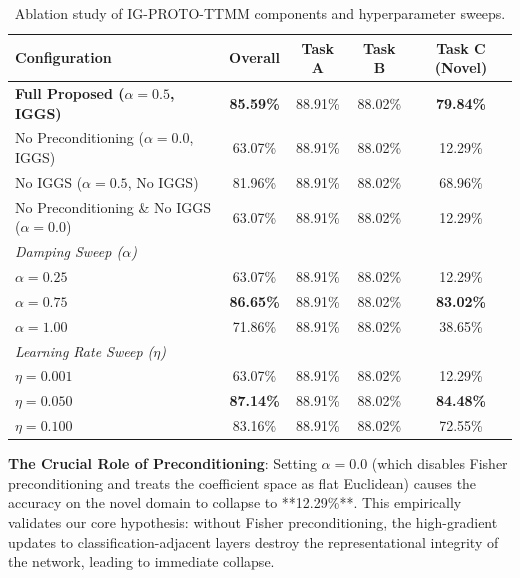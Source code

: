\documentclass{article}
\theoremstyle{plain}
\theoremstyle{definition}
\theoremstyle{remark}
\begin{document}
\begin{table}[t]
\caption{Ablation study of IG-PROTO-TTMM components and hyperparameter sweeps.}
\label{tab:ablations}
\vskip 0.15in
\begin{center}
\begin{small}
\begin{sc}
\begin{tabular}{lcccc}
\toprule
Configuration & Overall & Task A & Task B & Task C (Novel) \\
\midrule
\textbf{Full Proposed ($\alpha=0.5$, IGGS)} & \textbf{85.59\%} & 88.91\% & 88.02\% & \textbf{79.84\%} \\
No Preconditioning ($\alpha=0.0$, IGGS) & 63.07\% & 88.91\% & 88.02\% & 12.29\% \\
No IGGS ($\alpha=0.5$, No IGGS) & 81.96\% & 88.91\% & 88.02\% & 68.96\% \\
No Preconditioning \& No IGGS ($\alpha=0.0$) & 63.07\% & 88.91\% & 88.02\% & 12.29\% \\
\midrule
\textit{Damping Sweep ($\alpha$)} \\
$\alpha = 0.25$ & 63.07\% & 88.91\% & 88.02\% & 12.29\% \\
$\alpha = 0.75$ & \textbf{86.65\%} & 88.91\% & 88.02\% & \textbf{83.02\%} \\
$\alpha = 1.00$ & 71.86\% & 88.91\% & 88.02\% & 38.65\% \\
\midrule
\textit{Learning Rate Sweep ($\eta$)} \\
$\eta = 0.001$ & 63.07\% & 88.91\% & 88.02\% & 12.29\% \\
$\eta = 0.050$ & \textbf{87.14\%} & 88.91\% & 88.02\% & \textbf{84.48\%} \\
$\eta = 0.100$ & 83.16\% & 88.91\% & 88.02\% & 72.55\% \\
\bottomrule
\end{tabular}
\end{sc}
\end{small}
\end{center}
\vskip -0.1in
\end{table}

\textbf{The Crucial Role of Preconditioning}: Setting $\alpha = 0.0$ (which disables Fisher preconditioning and treats the coefficient space as flat Euclidean) causes the accuracy on the novel domain to collapse to **12.29\%**. This empirically validates our core hypothesis: without Fisher preconditioning, the high-gradient updates to classification-adjacent layers destroy the representational integrity of the network, leading to immediate collapse.
\end{document}
